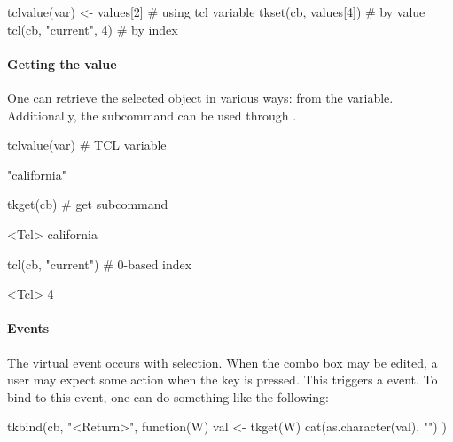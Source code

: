 \begin{Schunk}
\begin{Sinput}
 tclvalue(var) <- values[2]            # using tcl variable
 tkset(cb, values[4])                  # by value
 tcl(cb, "current", 4)                 # by index
\end{Sinput}
\end{Schunk}


\paragraph{Getting the value}
One can retrieve the selected object in various ways: from the \TCL\/
variable. Additionally, the  subcommand
can be used through .

\begin{Schunk}
\begin{Sinput}
 tclvalue(var)                           # TCL variable
\end{Sinput}
\begin{Soutput}
[1] "california"
\end{Soutput}
\begin{Sinput}
 tkget(cb)                               # get subcommand
\end{Sinput}
\begin{Soutput}
<Tcl> california 
\end{Soutput}
\begin{Sinput}
 tcl(cb, "current")                      # 0-based index
\end{Sinput}
\begin{Soutput}
<Tcl> 4 
\end{Soutput}
\end{Schunk}


\paragraph{Events}
The virtual event  occurs with
selection. When the combo box may be edited, a user may expect some
action when the  key is pressed. This triggers a
 event. To bind to this event, one can do something
like the following:

\begin{Schunk}
\begin{Sinput}
 tkbind(cb, "<Return>", function(W) {
   val <- tkget(W)
   cat(as.character(val), "\n")
 })
\end{Sinput}
\end{Schunk}



